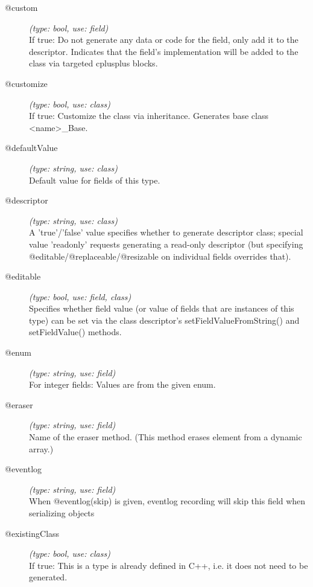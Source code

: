 \begin{description}
\item[@custom] \textit{(type: bool, use: field)} \\
  If true: Do not generate any data or code for the field, only add it to the
  descriptor. Indicates that the field's implementation will be added to the
  class via targeted cplusplus blocks.

\item[@customize] \textit{(type: bool, use: class)} \\
  If true: Customize the class via inheritance. Generates base class
  <name>\_Base.

\item[@defaultValue] \textit{(type: string, use: class)} \\
  Default value for fields of this type.

\item[@descriptor] \textit{(type: string, use: class)} \\
  A 'true'/'false' value specifies whether to generate descriptor class;
  special value 'readonly' requests generating a read-only descriptor (but
  specifying @editable/@replaceable/@resizable on individual fields overrides
  that).

\item[@editable] \textit{(type: bool, use: field, class)} \\
  Specifies whether field value (or value of fields that are instances of this
  type) can be set via the class descriptor's setFieldValueFromString() and
  setFieldValue() methods.

\item[@enum] \textit{(type: string, use: field)} \\
  For integer fields: Values are from the given enum.

\item[@eraser] \textit{(type: string, use: field)} \\
  Name of the eraser method. (This method erases element from a dynamic
  array.)

\item[@eventlog] \textit{(type: string, use: field)} \\
  When @eventlog(skip) is given, eventlog recording will skip this field when
  serializing objects

\item[@existingClass] \textit{(type: bool, use: class)} \\
  If true: This is a type is already defined in C++, i.e. it does not need to
  be generated.


\end{description}
